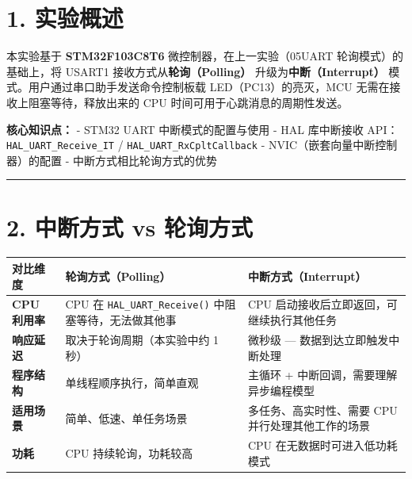 \documentclass[
  chinese,
  UTF8,
  oneside,
  openany]{ctexbook}
\begin{document}
\section{1. 实验概述}\label{ux5b9eux9a8cux6982ux8ff0-1}

本实验基于 \textbf{STM32F103C8T6} 微控制器，在上一实验（05UART
轮询模式）的基础上，将 USART1 接收方式从\textbf{轮询（Polling）}
升级为\textbf{中断（Interrupt）} 模式。用户通过串口助手发送命令控制板载
LED（PC13）的亮灭，MCU 无需在接收上阻塞等待，释放出来的 CPU
时间可用于心跳消息的周期性发送。

\textbf{核心知识点：} - STM32 UART 中断模式的配置与使用 - HAL 库中断接收
API：\texttt{HAL\_UART\_Receive\_IT} /
\texttt{HAL\_UART\_RxCpltCallback} - NVIC（嵌套向量中断控制器）的配置 -
中断方式相比轮询方式的优势

\begin{center}\rule{0.5\linewidth}{0.5pt}\end{center}

\section{2. 中断方式 vs
轮询方式}\label{ux4e2dux65adux65b9ux5f0f-vs-ux8f6eux8be2ux65b9ux5f0f}

\begin{longtable}[]{@{}
  >{\raggedright\arraybackslash}p{}
  >{\raggedright\arraybackslash}p{}
  >{\raggedright\arraybackslash}p{}@{}}
\toprule\noalign{}
\begin{minipage}[b]{\linewidth}\raggedright
对比维度
\end{minipage} & \begin{minipage}[b]{\linewidth}\raggedright
轮询方式（Polling）
\end{minipage} & \begin{minipage}[b]{\linewidth}\raggedright
中断方式（Interrupt）
\end{minipage} \\
\midrule\noalign{}
\endhead
\bottomrule\noalign{}
\endlastfoot
\textbf{CPU 利用率} & CPU 在 \texttt{HAL\_UART\_Receive()}
中阻塞等待，无法做其他事 & CPU 启动接收后立即返回，可继续执行其他任务 \\
\textbf{响应延迟} & 取决于轮询周期（本实验中约 1 秒） & 微秒级 ---
数据到达立即触发中断处理 \\
\textbf{程序结构} & 单线程顺序执行，简单直观 & 主循环 +
中断回调，需要理解异步编程模型 \\
\textbf{适用场景} & 简单、低速、单任务场景 & 多任务、高实时性、需要 CPU
并行处理其他工作的场景 \\
\textbf{功耗} & CPU 持续轮询，功耗较高 & CPU
在无数据时可进入低功耗模式 \\
\end{longtable}
\end{document}
